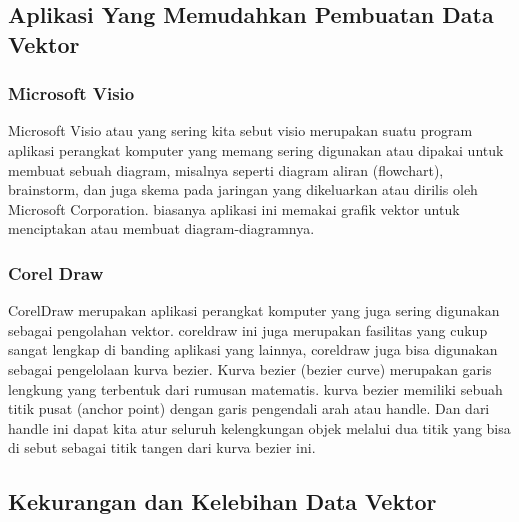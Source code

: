 \subsection {Aplikasi Yang Memudahkan Pembuatan Data Vektor}
\subsubsection {Microsoft Visio}
Microsoft Visio atau yang sering kita sebut visio merupakan suatu program aplikasi perangkat komputer yang memang sering digunakan atau dipakai untuk membuat sebuah diagram, misalnya seperti diagram aliran (flowchart), brainstorm, dan juga skema pada jaringan yang dikeluarkan atau dirilis oleh Microsoft Corporation. biasanya aplikasi ini memakai grafik vektor untuk menciptakan atau membuat diagram-diagramnya.
\subsubsection {Corel Draw}
CorelDraw merupakan aplikasi perangkat komputer yang juga sering digunakan sebagai pengolahan vektor. coreldraw ini juga merupakan fasilitas yang cukup sangat lengkap di banding aplikasi yang lainnya, coreldraw juga bisa digunakan sebagai pengelolaan kurva bezier. Kurva bezier (bezier curve) merupakan garis lengkung yang terbentuk dari rumusan matematis. 
kurva bezier memiliki sebuah titik pusat (anchor point) dengan garis pengendali arah atau handle. Dan dari handle ini dapat kita atur seluruh kelengkungan objek melalui dua titik yang bisa di sebut sebagai titik tangen dari kurva bezier ini.

\subsection{Kekurangan dan Kelebihan Data Vektor}
